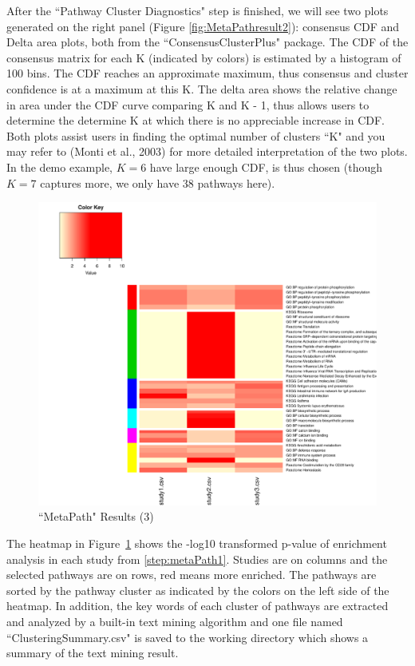 After the ``Pathway Cluster Diagnostics" step is finished, we will see two plots generated on the right panel (Figure \ref{fig:MetaPathresult2}): consensus CDF and Delta area plots, both from the ``ConsensusClusterPlus" package. The CDF of the consensus matrix for each K (indicated by colors) is estimated by a histogram of 100 bins. The CDF
reaches an approximate maximum, thus consensus and cluster confidence is at a maximum at this K. The delta area shows the relative change in area under the CDF curve comparing K and K - 1, thus allows users to determine the determine K at which there is no appreciable increase in CDF. Both plots assist users in finding the optimal number of clusters ``K" and you may refer to (Monti et al., 2003) for more detailed interpretation of the two plots. In the demo example, $K=6$ have large enough CDF, is thus chosen (though $K=7$ captures more, we only have 38 pathways here). 

\begin{figure}[H]
\begin{center}
\includegraphics[scale=0.6]{./figure/metaPath/Heatmap_clusters_all.pdf}
\caption{``MetaPath" Results (3)}
\label{fig:MetaPathresult3}
\end{center}
\end{figure}


The heatmap in Figure~\ref{fig:MetaPathresult3} shows the -log10 transformed p-value of enrichment analysis in each study from \ref{step:metaPath1}. 
Studies are on columns and the selected pathways are on rows, red means more enriched. The pathways are sorted by the pathway cluster as indicated by the colors on the left side of the heatmap. 
In addition, 
the key words of each cluster of pathways are extracted and analyzed by a built-in text mining algorithm and one file named ``Clustering\textunderscore Summary.csv" is saved to the working directory which shows a summary of the text mining result. 



